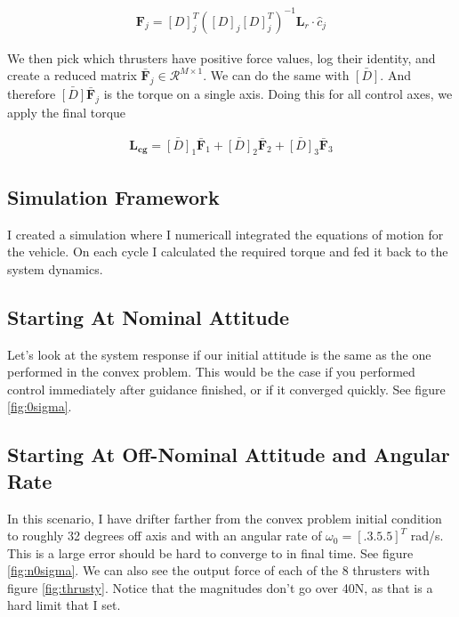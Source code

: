 \begin{align}
\mathbf{F}_j = \left[D\right]_j^T (\left[D\right]_j \left[D\right]_j^T)^{-1}
\mathbf{L}_r \cdot \hat{c}_j
\end{align}

We then pick which thrusters have positive force values, log their identity, and create a reduced matrix $\bar{\mathbf{F}}_j \in \mathcal{R}^{M\times1}$. We can do the same with $\bar{\left[D\right]}$. And therefore $\bar{\left[D\right]}\bar{\mathbf{F}}_j$ is the torque on a single axis. Doing this for all control axes, we apply the final torque 

\begin{align}
\mathbf{L_{cg}} = \bar{\left[D\right]}_1\bar{\mathbf{F}}_1 + \bar{\left[D\right]}_2\bar{\mathbf{F}}_2 + \bar{\left[D\right]}_3\bar{\mathbf{F}}_3
\end{align}

\subsection{Simulation Framework}
I created a simulation where I numericall integrated the equations of motion for the vehicle. On each cycle I calculated the required torque and fed it back to the system dynamics.


\subsection{Starting At Nominal Attitude}
Let's look at the system response if our initial attitude is the same as the one performed in the convex problem. This would be the case if you performed control immediately after guidance finished, or if it converged quickly. See figure \ref{fig:0sigma}.


\subsection{Starting At Off-Nominal Attitude and Angular Rate}
In this scenario, I have drifter farther from the convex problem initial condition to roughly 32 degrees off axis and with an angular rate of $\omega_0 = \left[.3 .5 .5 \right]^T$ rad/s. This is a large error should be hard to converge to in final time. See figure \ref{fig:n0sigma}. We can also see the output force of each of the 8 thrusters with figure \ref{fig:thrusty}. Notice that the magnitudes don't go over 40N, as that is a hard limit that I set.


